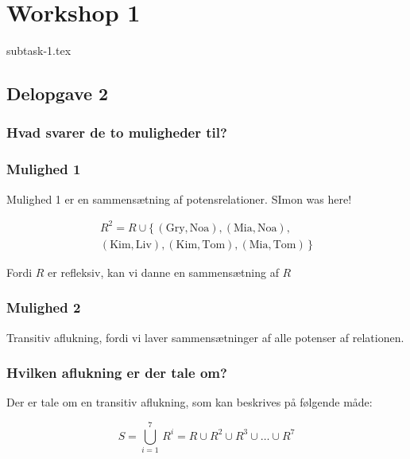 \section{Workshop 1}\label{sec:workshop-1}

{subtask-1.tex}

\subsection{Delopgave 2}\label{subsec:delopgave-2}

\subsubsection{Hvad svarer de to muligheder til?}\label{subsubsec:hvad-svarer-de-to-muligheder-til?}

\subsubsection*{Mulighed 1}
Mulighed 1 er en sammensætning af potensrelationer. SImon was here!

\begin{equation}
    \begin{split}
        R^2 = R \cup \{\,(\text{Gry}, \text{Noa}), (\text{Mia}, \text{Noa}), \\
        (\text{Kim}, \text{Liv}), (\text{Kim}, \text{Tom}), (\text{Mia}, \text{Tom})\,\}
    \end{split}\label{eq:equation7}
\end{equation}

Fordi \(R\) er refleksiv, kan vi danne en sammensætning af \(R\)

\subsubsection*{Mulighed 2}
Transitiv aflukning, fordi vi laver sammensætninger af alle potenser af relationen.

\subsubsection{Hvilken aflukning er der tale om?}
Der er tale om en transitiv aflukning, som kan beskrives på følgende måde:

\begin{equation}
    S = \bigcup_{i=1}^{7} \, R^{i} = R \cup R^2 \cup R^3 \cup \ldots \cup R^7 \label{eq:equation6}
\end{equation}


